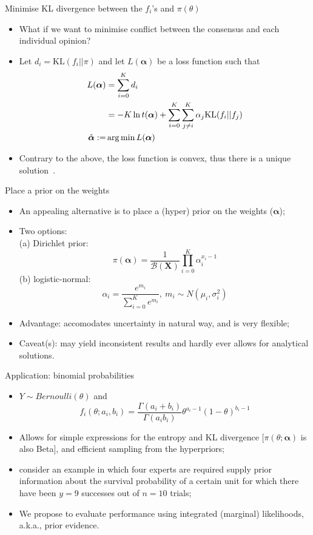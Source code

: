 \begin{frame}{Minimise KL divergence between the $f_i$'s and $\pi(\theta)$}
\begin{itemize}
 \item What if we want to minimise conflict between the consensus and each individual opinion?
 \item Let $d_i = \text{KL}(f_i || \pi)$ and let $L(\boldsymbol\alpha)$ be a loss function such that
\begin{align}
L(\boldsymbol\alpha) &= \sum_{i=0}^Kd_i \\
     &= -K\ln t(\boldsymbol\alpha) + \sum_{i=0}^K\sum_{j\neq i}^K\alpha_j\text{KL}(f_i||f_j) \\
     \hat{\boldsymbol\alpha}:=& \operatorname*{arg\,min} L(\boldsymbol\alpha)   
\end{align}
\item Contrary to the above, the loss function is convex, thus there is a unique solution~\citep{rufo2012A}.
\end{itemize}
\end{frame}
\begin{frame}{Place a prior on the weights}
 \begin{itemize}
  \item An appealing alternative is to place a (hyper) prior on the weights ($\boldsymbol\alpha$);
  \item Two options:\\
 (a) Dirichlet prior:
\[ \pi(\boldsymbol\alpha) = \frac{1}{\mathcal{B}(\boldsymbol X)}\prod_{i=0}^K \alpha_i^{x_i-1}\]
 (b) logistic-normal:
 \[\alpha_i = \frac{e^{m_i}}{\sum_{i=0}^{K} e^{m_i}}, \: m_i \sim N(\mu_i, \sigma_i^2)\]
 \item Advantage: accomodates uncertainty in natural way, and is very flexible;
 \item Caveat(s): may yield inconsistent results and hardly ever allows for analytical solutions.
 \end{itemize}
\end{frame}
\begin{frame}{Application: binomial probabilities}
 \begin{itemize}
  \item $Y\sim Bernoulli(\theta)$ and
  \[f_i(\theta;a_i, b_i) = \frac{\Gamma(a_i + b_i)}{\Gamma(a_i b_i)} \theta^{a_i-1}(1-\theta)^{b_i-1}\]
  \item Allows for simple expressions for the entropy and KL divergence [$\pi(\theta; \boldsymbol\alpha)$ is also Beta], and efficient sampling from the hyperpriors;
  \item \cite{savchuk1994} consider an example in which four experts are required supply prior information about the survival probability of
a certain unit for which there have been $y = 9$ successes out of $n = 10$ trials;
  \item We propose to evaluate performance using integrated (marginal) likelihoods, a.k.a., prior evidence.
 \end{itemize}
\end{frame}
